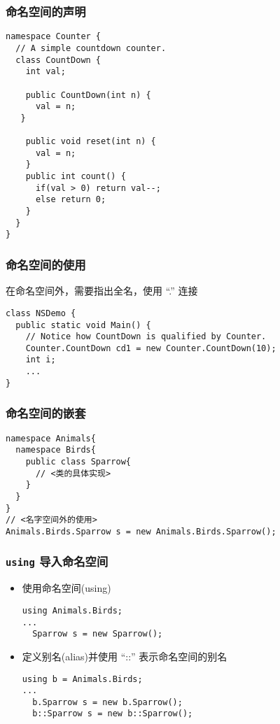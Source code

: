 \begin{frame}[fragile]
\frametitle{命名空间的声明}
\begin{lstlisting}
namespace Counter {
  // A simple countdown counter.
  class CountDown {
    int val;

    public CountDown(int n) {
      val = n;
   }

    public void reset(int n) {
      val = n;
    }
    public int count() {
      if(val > 0) return val--;
      else return 0;
    }
  }
}
\end{lstlisting}
\end{frame}

\begin{frame}[fragile]
\frametitle{命名空间的使用}
在命名空间外，需要指出全名，使用 ``.'' 连接
\begin{lstlisting}
class NSDemo {
  public static void Main() {
    // Notice how CountDown is qualified by Counter.
    Counter.CountDown cd1 = new Counter.CountDown(10);
    int i;
    ...
}
\end{lstlisting}
\end{frame}

\begin{frame}[fragile]
\frametitle{命名空间的嵌套}
\begin{lstlisting}[escapeinside=<>]
namespace Animals{
  namespace Birds{
    public class Sparrow{
      // <类的具体实现>
    }
  }
}
// <名字空间外的使用>
Animals.Birds.Sparrow s = new Animals.Birds.Sparrow();
\end{lstlisting}
\end{frame}

\begin{frame}[fragile]
\frametitle{\texttt{using} 导入命名空间}

\begin{itemize}
\item 使用命名空间(using)
\begin{lstlisting}
using Animals.Birds;
...
  Sparrow s = new Sparrow();
\end{lstlisting}
\item 定义别名(alias)并使用 ``::'' 表示命名空间的别名
\begin{lstlisting}
using b = Animals.Birds;
...
  b.Sparrow s = new b.Sparrow();
  b::Sparrow s = new b::Sparrow();
\end{lstlisting}
\end{itemize}
\end{frame}

